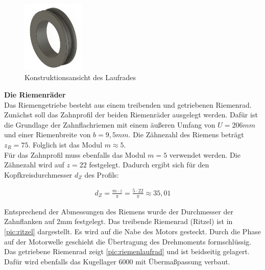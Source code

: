 \begin{figure}[h]
	\centering
	\includegraphics[width=3cm]{laufrad.png}
	\caption{Konstruktionsansicht des Laufrades}
	\label{pic:laufrad}
\end{figure}
\newpage

\textbf{Die Riemenräder}\\   
Das Riemengetriebe besteht aus einem treibenden und getriebenen Riemenrad. Zunächst soll das Zahnprofil der beiden Riemenräder ausgelegt werden. Dafür ist die Grundlage der Zahnflachriemen mit einem äußeren Umfang von $U = 206mm$ und einer Riemenbreite von $b=9,5mm$. Die Zähnezahl des Riemens beträgt $z_R=75$. Folglich ist das Modul $m \approx 5$. \\

 Für das Zahnprofil muss ebenfalls das Modul $m=5$ verwendet werden. Die Zähnezahl wird auf $z=22$ festgelegt. Dadurch ergibt sich für den Kopfkreisdurchmesser $d_Z$ des Profils: 
 
 \begin{align}
 	d_Z =  \frac{m \cdot z}{\pi} = \frac{5 \cdot 22}{\pi} \approx 35,01
 \end{align}


Entsprechend der Abmessungen des Riemens wurde der Durchmesser der Zahnflanken auf 2mm festgelegt.  Das treibende Riemenrad (Ritzel) ist in \autoref{pic:ritzel} dargestellt. Es wird auf die Nabe des Motors gesteckt. Durch die Phase auf der Motorwelle geschieht die Übertragung des Drehmoments formschlüssig.  Das getriebene Riemenrad zeigt \autoref{pic:riemenlaufrad} und ist beidseitig gelagert. Dafür wird ebenfalls das Kugellager 6000 mit Übermaßpassung verbaut.  
 

